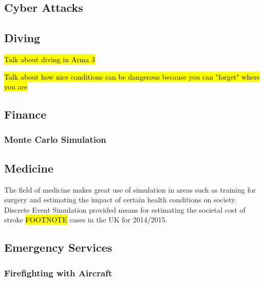 \documentclass{article}
\begin{document}

\subsection{Cyber Attacks}

\subsection{Diving}

\hl{Talk about diving in Arma 3}

\hl{Talk about how nice conditions can be dangerous because you can "forget" where you are}

\subsection{Finance}

\subsubsection{Monte Carlo Simulation}


\subsection{Medicine}


The field of medicine makes great use of simulation in areas such as training for surgery  and estimating the impact of certain health conditions on society. Discrete Event Simulation provided means for estimating the societal cost of stroke \hl{FOOTNOTE} cases in the UK for 2014/2015. \cite{afz162}

\subsection{Emergency Services}

\subsubsection{Firefighting with Aircraft}
\end{document}

